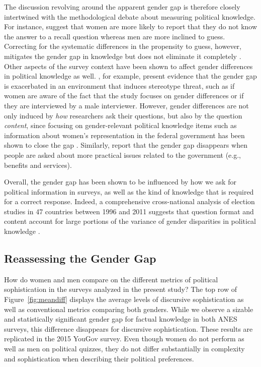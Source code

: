 The discussion revolving around the apparent gender gap is therefore closely intertwined with the methodological debate about measuring political knowledge. For instance, \citet{mondak2004knowledge} suggest that women are more likely to report that they do not know the answer to a recall question whereas men are more inclined to guess. Correcting for the systematic differences in the propensity to guess, however, mitigates the gender gap in knowledge but does not eliminate it completely \citep[see also][]{lizotte2009explaining}. Other aspects of the survey context have been shown to affect gender differences in political knowledge as well. \citet{mcglone2006stereotype}, for example, present evidence that the gender gap is exacerbated in an environment that induces stereotype threat, such as if women are aware of the fact that the study focuses on gender differences or if they are interviewed by a male interviewer. However, gender differences are not only induced by \textit{how} researchers ask their questions, but also by the question \textit{content}, since focusing on gender-relevant political knowledge items such as information about women's representation in the federal government has been shown to close the gap \citep{graber2001processing,dolan2011women,fraile2014does,jerit2017revisiting}. Similarly, \citet{stolle2010women} report that the gender gap disappears when people are asked about more practical issues related to the government (e.g., benefits and services).

Overall, the gender gap has been shown to be influenced by how we ask for political information in surveys, as well as the kind of knowledge that is required for a correct response. Indeed, a comprehensive cross-national analysis of election studies in 47 countries between 1996 and 2011 suggests that question format and content account for large portions of the variance of gender disparities in political knowledge \citep{fortin2016cross}.


\subsection*{Reassessing the Gender Gap}
How do women and men compare on the different metrics of political sophistication in the surveys analyzed in the present study? The top row of Figure~\ref{fig:meandiff} displays the average levels of discursive sophistication as well as conventional metrics comparing both genders. While we observe a sizable and statistically significant gender gap for factual knowledge in both ANES surveys, this difference disappears for discursive sophistication. These results are replicated in the 2015 YouGov survey. Even though women do not perform as well as men on political quizzes, they do not differ substantially in complexity and sophistication when describing their political preferences.

